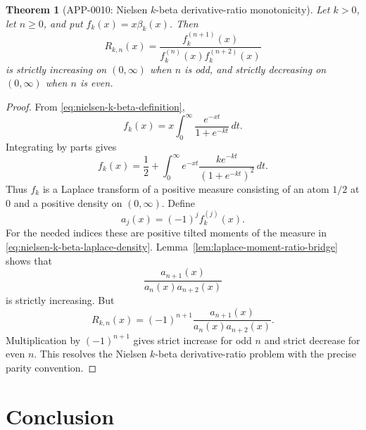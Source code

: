 \documentclass[11pt]{article}
\numberwithin{equation}{section}
\newtheorem{theorem}{Theorem}[section]
\theoremstyle{definition}
\theoremstyle{remark}
\newcommand{\1}{\mathbf 1}
\begin{document}
\begin{theorem}[APP-0010: Nielsen \(k\)-beta derivative-ratio monotonicity]
\label{thm:nielsen-k-beta-derivative-ratio}
Let \(k>0\), let \(n\ge0\), and put \(f_k(x)=x\beta_k(x)\).  Then
\begin{equation}
\label{eq:nielsen-k-beta-ratio}
R_{k,n}(x)=
\frac{f_k^{(n+1)}(x)}
{f_k^{(n)}(x)f_k^{(n+2)}(x)}
\end{equation}
is strictly increasing on \((0,\infty)\) when \(n\) is odd, and strictly decreasing on \((0,\infty)\) when \(n\) is even.
\end{theorem}

\begin{proof}
From \eqref{eq:nielsen-k-beta-definition},
\begin{equation}
\label{eq:nielsen-k-beta-x-integral}
f_k(x)=x\int_0^\infty \frac{e^{-xt}}{1+e^{-kt}}\,dt.
\end{equation}
Integrating by parts gives
\begin{equation}
\label{eq:nielsen-k-beta-laplace-density}
f_k(x)
=\frac12+
\int_0^\infty e^{-xt}
\frac{k e^{-kt}}{(1+e^{-kt})^2}\,dt.
\end{equation}
Thus \(f_k\) is a Laplace transform of a positive measure consisting of an atom \(1/2\) at \(0\) and a positive density on \((0,\infty)\).  Define
\begin{equation}
\label{eq:nielsen-k-beta-aj}
a_j(x)=(-1)^j f_k^{(j)}(x).
\end{equation}
For the needed indices these are positive tilted moments of the measure in \eqref{eq:nielsen-k-beta-laplace-density}.  Lemma~\ref{lem:laplace-moment-ratio-bridge} shows that
\begin{equation}
\label{eq:nielsen-k-beta-Bn-increasing}
\frac{a_{n+1}(x)}{a_n(x)a_{n+2}(x)}
\end{equation}
is strictly increasing.  But
\begin{equation}
\label{eq:nielsen-k-beta-sign}
R_{k,n}(x)=(-1)^{n+1}
\frac{a_{n+1}(x)}{a_n(x)a_{n+2}(x)}.
\end{equation}
Multiplication by \((-1)^{n+1}\) gives strict increase for odd \(n\) and strict decrease for even \(n\).  This resolves the Nielsen \(k\)-beta derivative-ratio problem with the precise parity convention.
\end{proof}

\section{Conclusion}
\end{document}
